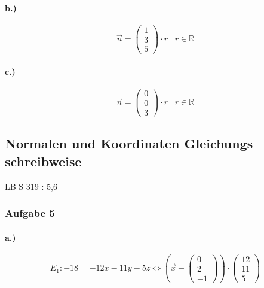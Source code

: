\documentclass{article}
\begin{document}
\paragraph*{b.)}

\begin{equation}
	\overrightarrow{n} = \begin{pmatrix}1\\3\\5\end{pmatrix} \cdot r \mid r \in \mathbb{R}
\end{equation}

\paragraph*{c.)}

\begin{equation}
	\overrightarrow{n} = \begin{pmatrix}0\\0\\3\end{pmatrix} \cdot r \mid r \in \mathbb{R}
\end{equation}
\newpage

\subsection*{Normalen und Koordinaten Gleichungs schreibweise}

LB S 319 : 5,6

\subsubsection*{Aufgabe 5}

\paragraph*{a.)}

\begin{equation}
	E_1 : -18 = -12x - 11y - 5z \Leftrightarrow (\overrightarrow{x} - \begin{pmatrix}0\\2\\-1\end{pmatrix} ) \cdot \begin{pmatrix}12\\11\\5\end{pmatrix}  
\end{equation}
\end{document}
